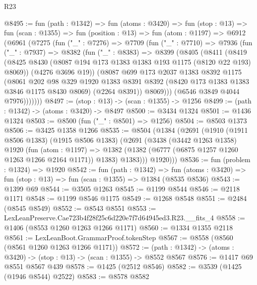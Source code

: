 \begin{lexlean}{R23}
\begin{coremodule}
@8495 := fun (path : @1342) =>
  fun (atoms : @3420) =>
  fun (stop : @13) =>
  fun (scan : @1355) =>
  fun (position : @13) =>
  fun (atom : @1197) =>
  @6912
    (@6961
      (@7275
        (fun ("_" : @7276) =>
        @7709
          (fun ("_" : @7710) =>
          @7936
            (fun ("_" : @7937) =>
            @8382
              (fun ("_" : @8383) =>
              @8399
                (@8405
                  (@8411
                    (@8419
                      (@8425 @8430 (@8087 @194 @173 @1383 @1383 @193 @1175 (@8120 @22 @193) @8069))
                      (@4276 @3696 @19))
                    (@8087
                      @699
                      @173
                      @2037
                      @1383
                      @8392
                      @1175
                      (@8061
                        @202
                        @98
                        @329
                        @1920
                        @1383
                        @8391
                        @8392
                        (@8420 @173 @1383 @1383 @3846 @1175 @8430 @8069)
                        (@2264 @8391))
                      @8069)))
                (@6546 @3849 @4044 @7976)))))))
@8497 := (stop : @13) -> (scan : @1355) -> @1256
@8499 := (path : @1342) -> (atoms : @3420) -> @8497
@8500 := @3434 @1324
@8501 := @1436 @1324
@8503 := @8500 (fun ("_" : @8501) => @1256)
@8504 := @8503 @1373
@8506 := @3425 @1358 @1266
@8535 := @8504
    (@1384
      (@2691
        (@1910
          (@1911 @8506 @1383)
          (@1915 @8506 @1383)
          (@2691
            (@3438
              (@3442 @1263 @1358)
              @1920
              (fun (atom : @1197) =>
              @1382 (@1382 (@6777 (@6875 @1257 @1260 @1263 @1266 @2164 @1171)) @1383) @1383)))
          @1920)))
@8536 := fun (problem : @1324) => @1920
@8542 := fun (path : @1342) =>
  fun (atoms : @3420) => fun (stop : @13) => fun (scan : @1355) => @1384 (@8535 @8536)
@8543 := @1399 @69
@8544 := @3505 @1263
@8545 := @1199 @8544
@8546 := @2118 @1171
@8548 := @1199 @8546 @1175
@8549 := @1268 @8548
@8551 := @2484 (@8545 @8549)
@8552 := @8543 @8551
@8553 := LexLeanPreserve.Cae723b4f28f25c6d220e7f7d64945ed3.R23.__fits_4
@8558 := @1406 (@8553 @1260 @1263 @1266 @1171)
@8560 := @1334 @1355 @2118
@8561 := LexLeanBoot.GrammarProof.tokenStep
@8567 := @8558 (@8560 (@8561 @1260 @1263 @1266 @1171))
@8572 := (path : @1342) -> (atoms : @3420) -> (stop : @13) -> (scan : @1355) -> @8552 @8567
@8576 := @1417 @69 @8551 @8567 @439
@8578 := @1425 (@2512 @8546)
@8582 := @3539 (@1425 (@1946 @8544) @2522)
@8583 := @8578 @8582

\end{coremodule}
\end{lexlean}
